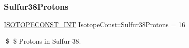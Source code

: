 \subsubsection{\texorpdfstring{Sulfur38\+Protons}{Sulfur38Protons}}
{\footnotesize\ttfamily \mbox{\hyperlink{group___isotope_const-_macros_ga5f18360b3e99483a35c32d789e62621c}{I\+S\+O\+T\+O\+P\+E\+C\+O\+N\+S\+T\+\_\+\+I\+NT}} Isotope\+Const\+::\+Sulfur38\+Protons = 16}

\$ \$ Protons in Sulfur-\/38. 